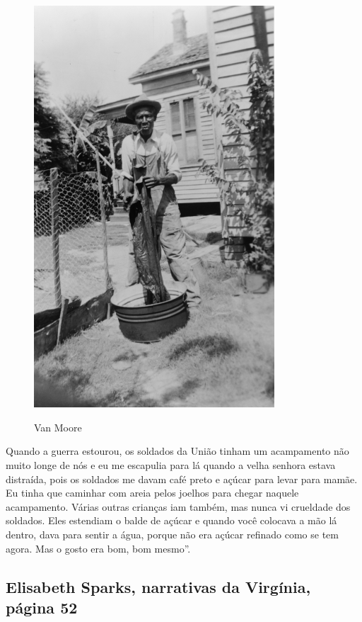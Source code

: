 \pagebreak
\thispagestyle{empty}
\begin{figure}[!ht]
\centering
 \includegraphics[width=90mm]{./imgs/vanmoore_recorte.jpg} \label{img22}
\caption{Van Moore}
\end{figure}

Quando a guerra estourou, os soldados da União tinham um acampamento não
muito longe de nós e eu me escapulia para lá quando a velha senhora
estava distraída, pois os soldados me davam café preto e açúcar para
levar para mamãe. Eu tinha que caminhar com areia pelos joelhos para
chegar naquele acampamento. Várias outras crianças iam também, mas nunca
vi crueldade dos soldados. Eles estendiam o balde de açúcar e quando
você colocava a mão lá dentro, dava para sentir a água, porque não era
açúcar refinado como se tem agora. Mas o gosto era bom, bom mesmo''.

\subsection{Elisabeth Sparks, narrativas da Virgínia, página 52}
\label{ref252} 

